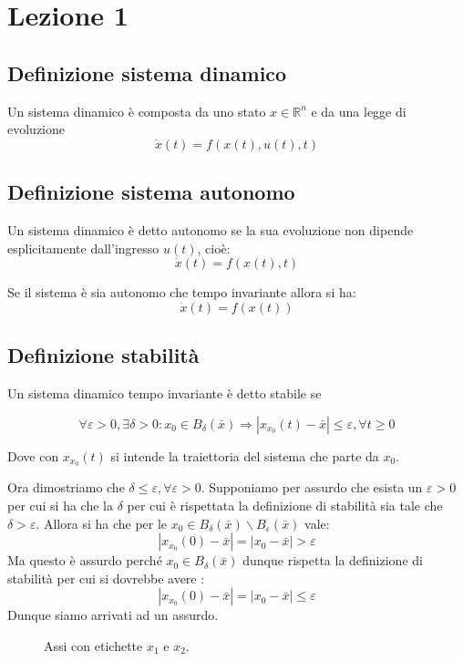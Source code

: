 \chapter{Lezione 1}


\section{Definizione sistema dinamico}

Un sistema dinamico 
è composta da uno stato \(x \in \mathbb{R}^{n}\)
e da una legge di evoluzione
\[\dot{x}(t) = f(x(t), u(t), t)\]

\section{Definizione sistema autonomo}

Un sistema dinamico è detto autonomo se la
sua evoluzione non dipende esplicitamente
dall'ingresso \(u(t)\), cioè:
\[\dot{x}(t) = f(x(t),t)\]

Se il sistema è sia autonomo che tempo invariante
allora si ha:
\[\dot{x}(t) = f(x(t))\]
\section{Definizione stabilità}

Un sistema dinamico 
tempo invariante è detto stabile se 

\[\forall \varepsilon > 0, 
\exists \delta > 0 : x_{0} 
\in B_{\delta}(\bar{x})
\Rightarrow |x_{x_{0}}(t) - \bar{x}| \le \varepsilon, \forall t \geq 0\]

Dove con \(x_{x_{0}}(t)\) si intende 
la traiettoria del sistema 
che parte da \(x_{0}\).


Ora dimostriamo che \(\delta \le 
\varepsilon ,
\forall \varepsilon > 0\).
Supponiamo per assurdo che 
esista un \(\varepsilon >0 \)
per cui si ha  
che la \(\delta\)
per cui è rispettata la 
definizione di stabilità sia
tale che
\(\delta > \varepsilon\).
Allora si ha che per
le 
\(x_{0} \in B_{\delta}(\bar{x}) \backslash
B_{\varepsilon}(\bar{x})\)
vale:
\[|x_{x_{0}}(0) - \bar{x}| 
= \left|x_{0} -\bar{x}\right|> \varepsilon\]
Ma questo è assurdo perché
\(x_{0} 
\in B_{\delta}(\bar{x})\)
dunque rispetta la definizione 
di stabilità per cui
si dovrebbe avere :
\[|x_{x_{0}}(0) - \bar{x}| 
= \left|x_{0} - \bar{x}\right|
\le \varepsilon
\]
Dunque siamo arrivati ad un assurdo.



\begin{figure}[h]
  \centering
  \caption{Assi con etichette $x_1$ e $x_2$.}
  \label{fig:assi-x1-x2}
\end{figure}
